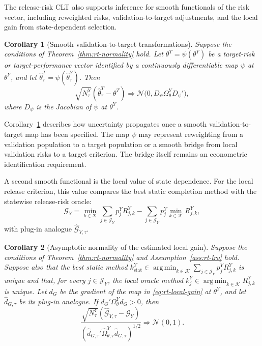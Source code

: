 \documentclass[a4paper, 12pt]{article}
\theoremstyle{plain}
\newtheorem{corollary}{Corollary}
\theoremstyle{remark}
\DeclareMathOperator*{\argmin}{arg\,min}
\newcommand{\Kcal}{\mathcal{K}}
\newcommand{\1}{\mathbf{1}}
\begin{document}
The release-risk CLT also supports inference for smooth functionals of the risk vector, including reweighted risks, validation-to-target adjustments, and the local gain from state-dependent selection.

\begin{corollary}[Smooth validation-to-target transformations]
\label{cor:rt-smooth-target}
Suppose the conditions of Theorem~\ref{thm:rt-normality} hold. Let \(\theta^T=\psi(\theta^Y)\) be a target-risk or target-performance vector identified by a continuously differentiable map \(\psi\) at \(\theta^Y\), and let \(\widehat\theta^T_\tau=\psi(\widehat\theta^Y_\tau)\). Then
\begin{equation}
\label{eq:rt-smooth-target-normality}
    \sqrt{N^Y_\tau}
    \left(\widehat\theta^T_\tau-\theta^T\right)
    \Rightarrow
    \mathcal N\!\bigl(0,D_\psi\Omega^Y_\theta D_\psi'\bigr),
\end{equation}
where \(D_\psi\) is the Jacobian of \(\psi\) at \(\theta^Y\).
\end{corollary}

Corollary~\ref{cor:rt-smooth-target} describes how uncertainty propagates once a smooth validation-to-target map has been specified. The map \(\psi\) may represent reweighting from a validation population to a target population or a smooth bridge from local validation risks to a target criterion. The bridge itself remains an econometric identification requirement.

A second smooth functional is the local value of state dependence. For the local release criterion, this value compares the best static completion method with the statewise release-risk oracle:
\begin{equation}
\label{eq:rt-local-gain}
    \mathcal G_Y
    =
    \min_{k\in\Kcal}\sum_{j\in\mathcal J_Y}p^Y_j R^Y_{j,k}
    -
    \sum_{j\in\mathcal J_Y}p^Y_j\min_{k\in\Kcal}R^Y_{j,k},
\end{equation}
with plug-in analogue \(\widehat{\mathcal G}_{Y,\tau}\).

\begin{corollary}[Asymptotic normality of the estimated local gain]
\label{cor:rt-gain-normality}
Suppose the conditions of Theorem~\ref{thm:rt-normality} and Assumption~\ref{ass:rt-lrv} hold. Suppose also that the best static method \(k^Y_{\mathrm{stat}}\in\argmin_{k\in\Kcal}\sum_{j\in\mathcal J_Y}p^Y_jR^Y_{j,k}\) is unique and that, for every \(j\in\mathcal J_Y\), the local oracle method \(k^Y_j\in\argmin_{k\in\Kcal}R^Y_{j,k}\) is unique. Let \(d_G\) be the gradient of the map in \eqref{eq:rt-local-gain} at \(\theta^Y\), and let \(\widehat d_{G,\tau}\) be its plug-in analogue. If \(d_G'\Omega^Y_\theta d_G>0\), then
\begin{equation}
\label{eq:rt-gain-normality}
    \frac{
    \sqrt{N^Y_\tau}(\widehat{\mathcal G}_{Y,\tau}-\mathcal G_Y)
    }{
    \left(\widehat d_{G,\tau}'\widehat\Omega^Y_{\theta,\tau}\widehat d_{G,\tau}\right)^{1/2}
    }
    \Rightarrow
    \mathcal N(0,1).
\end{equation}
\end{corollary}
\end{document}
